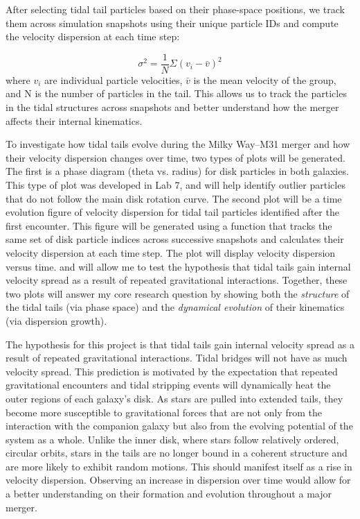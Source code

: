 \documentclass[fleqn,usenatbib]{mnras}
\begin{document}
After selecting tidal tail particles based on their phase-space positions, we track them across simulation snapshots using their unique particle IDs and compute the velocity dispersion at each time step:

\begin{equation}
    \sigma^2 = \frac{1}{N} \Sigma(v_i-\bar{v})^2
\end{equation}
where $v_i$ are individual particle velocities, $\bar{v}$ is the mean velocity of the group, and N is the number of particles in the tail. This allows us to track the particles in the tidal structures across snapshots and better understand how the merger affects their internal kinematics.

To investigate how tidal tails evolve during the Milky Way–M31 merger and how their velocity dispersion changes over time, two types of plots will be generated. The first is a phase diagram (theta vs. radius) for disk particles in both galaxies. This type of plot was developed in Lab 7, and will help identify outlier particles that do not follow the main disk rotation curve. The second plot will be a time evolution figure of velocity dispersion for tidal tail particles identified after the first encounter. This figure will be generated using a function that tracks the same set of disk particle indices across successive snapshots and calculates their velocity dispersion at each time step. The plot will display velocity dispersion versus time.  and will allow me to test the hypothesis that tidal tails gain internal velocity spread as a result of repeated gravitational interactions. Together, these two plots will answer my core research question by showing both the \textit{structure} of the tidal tails (via phase space) and the \textit{dynamical evolution} of their kinematics (via dispersion growth).

The hypothesis for this project is that tidal tails gain internal velocity spread as a result of repeated gravitational interactions. Tidal bridges will not have as much velocity spread. This prediction is motivated by the expectation that repeated gravitational encounters and tidal stripping events will dynamically heat the outer regions of each galaxy's disk. As stars are pulled into extended tails, they become more susceptible to gravitational forces that are not only from the interaction with the companion galaxy but also from the evolving potential of the system as a whole. Unlike the inner disk, where stars follow relatively ordered, circular orbits, stars in the tails are no longer bound in a coherent structure and are more likely to exhibit random motions. This should manifest itself as a rise in velocity dispersion. Observing an increase in dispersion over time would allow for a better understanding on their formation and evolution throughout a major merger. 





\bsp	%
\label{lastpage}
\end{document}
